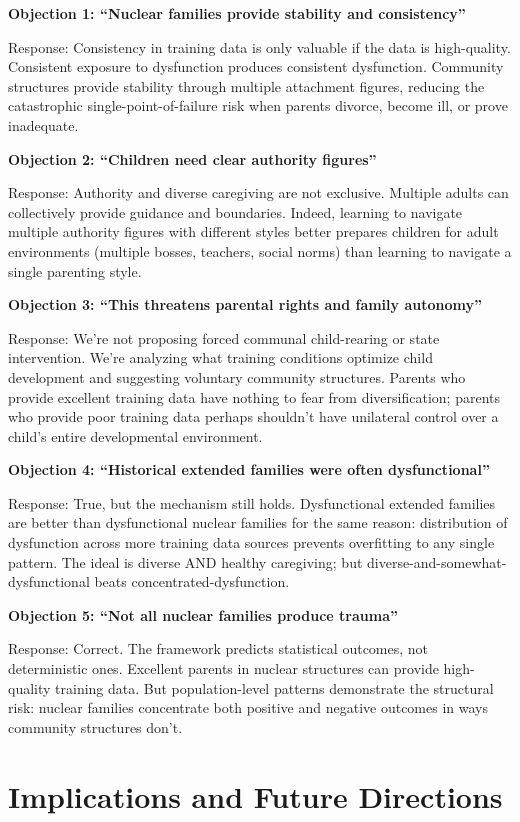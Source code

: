 \documentclass{article}
\begin{document}
\textbf{Objection 1: ``Nuclear families provide stability and consistency''}

Response: Consistency in training data is only valuable if the data is high-quality. Consistent exposure to dysfunction produces consistent dysfunction. Community structures provide stability through multiple attachment figures, reducing the catastrophic single-point-of-failure risk when parents divorce, become ill, or prove inadequate.

\textbf{Objection 2: ``Children need clear authority figures''}

Response: Authority and diverse caregiving are not exclusive. Multiple adults can collectively provide guidance and boundaries. Indeed, learning to navigate multiple authority figures with different styles better prepares children for adult environments (multiple bosses, teachers, social norms) than learning to navigate a single parenting style.

\textbf{Objection 3: ``This threatens parental rights and family autonomy''}

Response: We're not proposing forced communal child-rearing or state intervention. We're analyzing what training conditions optimize child development and suggesting voluntary community structures. Parents who provide excellent training data have nothing to fear from diversification; parents who provide poor training data perhaps shouldn't have unilateral control over a child's entire developmental environment.

\textbf{Objection 4: ``Historical extended families were often dysfunctional''}

Response: True, but the mechanism still holds. Dysfunctional extended families are better than dysfunctional nuclear families for the same reason: distribution of dysfunction across more training data sources prevents overfitting to any single pattern. The ideal is diverse AND healthy caregiving; but diverse-and-somewhat-dysfunctional beats concentrated-dysfunction.

\textbf{Objection 5: ``Not all nuclear families produce trauma''}

Response: Correct. The framework predicts statistical outcomes, not deterministic ones. Excellent parents in nuclear structures can provide high-quality training data. But population-level patterns demonstrate the structural risk: nuclear families concentrate both positive and negative outcomes in ways community structures don't.

\section{Implications and Future Directions}
\end{document}
